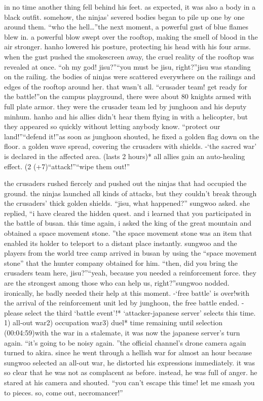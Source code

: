 in no time another thing fell behind his feet.
 as expected, it was also a body in a black outfit.
 somehow, the ninjas’ severed bodies began to pile up one by one around them.
“who the hell…”the next moment, a powerful gust of blue flames blew in.
 a powerful blow swept over the rooftop, making the smell of blood in the air stronger.
hanho lowered his posture, protecting his head with his four arms.
when the gust pushed the smokescreen away, the cruel reality of the rooftop was revealed at once.
“oh my god! jisu?”“you must be jisu, right?”jisu was standing on the railing.
 the bodies of ninjas were scattered everywhere on the railings and edges of the rooftop around her.
 that wasn’t all.
“crusader team! get ready for the battle!”on the campus playground, there were about 80 knights armed with full plate armor.
 they were the crusader team led by junghoon and his deputy minhum.
hanho and his allies didn’t hear them flying in with a helicopter, but they appeared so quickly without letting anybody know.
“protect our land!”“defend it!”as soon as junghoon shouted, he fixed a golden flag down on the floor.
a golden wave spread, covering the crusaders with shields.
-‘the sacred war’ is declared in the affected area.
 (lasts 2 hours)* all allies gain an auto-healing effect.
 (2%
 (+7)“attack!”“wipe them out!”

the crusaders rushed fiercely and pushed out the ninjas that had occupied the ground.
 the ninjas launched all kinds of attacks, but they couldn’t break through the crusaders’ thick golden shields.
“jisu, what happened?” sungwoo asked.
she replied, “i have cleared the hidden quest.
 and i learned that you participated in the battle of busan.
 this time again, i asked the king of the great mountain and obtained a space movement stone.
”the space movement stone was an item that enabled its holder to teleport to a distant place instantly.
 sungwoo and the players from the world tree camp arrived in busan by using the “space movement stone” that the hunter company obtained for him.
“then, did you bring the crusaders team here, jisu?”“yeah, because you needed a reinforcement force.
 they are the strongest among those who can help us, right?”sungwoo nodded.
 ironically, he badly needed their help at this moment.
-‘free battle’ is over!with the arrival of the reinforcement unit led by junghoon, the free battle ended.
-please select the third ‘battle event’!* ‘attacker-japanese server’ selects this time.
1) all-out war2) occupation war3) duel* time remaining until selection (00:04:59)with the war in a stalemate, it was now the japanese server’s turn again.
“it’s going to be noisy again.
”the official channel’s drone camera again turned to akira.
 since he went through a hellish war for almost an hour because sungwoo selected an all-out war, he distorted his expressions immediately.
it was so clear that he was not as complacent as before.
 instead, he was full of anger.
he stared at his camera and shouted.
“you can’t escape this time! let me smash you to pieces.
 so, come out, necromancer!”

 